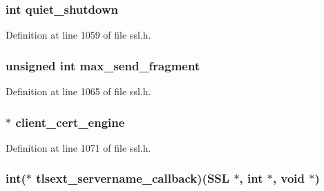 \subsubsection[{\texorpdfstring{quiet\+\_\+shutdown}{quiet_shutdown}}]{\setlength{\rightskip}{0pt plus 5cm}int quiet\+\_\+shutdown}\hypertarget{structssl__ctx__st_aa8eaa5b8fc4a19fa46dcac8863276b40}{}\label{structssl__ctx__st_aa8eaa5b8fc4a19fa46dcac8863276b40}


Definition at line 1059 of file ssl.\+h.

\subsubsection[{\texorpdfstring{max\+\_\+send\+\_\+fragment}{max_send_fragment}}]{\setlength{\rightskip}{0pt plus 5cm}unsigned int max\+\_\+send\+\_\+fragment}\hypertarget{structssl__ctx__st_a15c488cf6f57671d97ad93153fdc5965}{}\label{structssl__ctx__st_a15c488cf6f57671d97ad93153fdc5965}


Definition at line 1065 of file ssl.\+h.

\subsubsection[{\texorpdfstring{client\+\_\+cert\+\_\+engine}{client_cert_engine}}]{ $\ast$ client\+\_\+cert\+\_\+engine}\hypertarget{structssl__ctx__st_adf66435c67b385019a86890109ea7e69}{}\label{structssl__ctx__st_adf66435c67b385019a86890109ea7e69}


Definition at line 1071 of file ssl.\+h.

\subsubsection[{\texorpdfstring{tlsext\+\_\+servername\+\_\+callback}{tlsext_servername_callback}}]{\setlength{\rightskip}{0pt plus 5cm}int($\ast$ tlsext\+\_\+servername\+\_\+callback)({\bf S\+SL} $\ast$, int $\ast$, {\bf void} $\ast$)}\hypertarget{structssl__ctx__st_aec1386a13ac4b445fb339a3cf79007d6}{}\label{structssl__ctx__st_aec1386a13ac4b445fb339a3cf79007d6}


